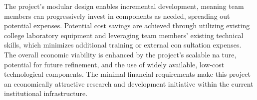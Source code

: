  The project’s modular design enables incremental development, meaning team members can
 progressively invest in components as needed, spreading out potential expenses. Potential cost savings are achieved through utilizing existing college laboratory equipment and leveraging
 team members’ existing technical skills, which minimizes additional training or external con
sultation expenses. The overall economic viability is enhanced by the project’s scalable na
ture, potential for future refinement, and the use of widely available, low-cost technological
 components. The minimal financial requirements make this project an economically attractive
 research and development initiative within the current institutional infrastructure.

